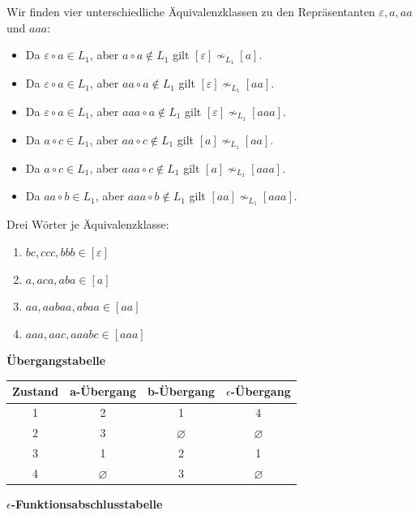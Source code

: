 \begin{teile}
	Wir finden vier unterschiedliche Äquivalenzklassen zu den Repräsentanten $\varepsilon, a, aa$ und $aaa$:
	\begin{itemize}
		\item Da $\varepsilon \circ a \in L_1$, aber $a \circ a \notin L_1$ gilt $[\varepsilon]\nsim_{L_1}[a]$.
		\item Da $\varepsilon \circ a \in L_1$, aber $aa \circ a \notin L_1$ gilt $[\varepsilon]\nsim_{L_1}[aa]$.
		\item Da $\varepsilon \circ a \in L_1$, aber $aaa \circ a \notin L_1$ gilt $[\varepsilon]\nsim_{L_1}[aaa]$.
		\item Da $a \circ c \in L_1$, aber $aa \circ c \notin L_1$ gilt $[a]\nsim_{L_1}[aa]$.
		\item Da $a \circ c \in L_1$, aber $aaa \circ c \notin L_1$ gilt $[a]\nsim_{L_1}[aaa]$.
		\item Da $aa \circ b \in L_1$, aber $aaa \circ b \notin L_1$ gilt $[aa]\nsim_{L_1}[aaa]$.
	\end{itemize}
	
	Drei Wörter je Äquivalenzklasse:
	\begin{enumerate}
		\item $bc, ccc, bbb \in [\varepsilon]$
		\item $a, aca, aba \in [a]$
		\item $aa, aabaa, abaa \in [aa]$
		\item $aaa, aac, aaabc \in [aaa]$
	\end{enumerate}
	\vspace{0.3cm}
	
	\item 
	\textbf{Übergangstabelle}
	
	\begin{tabular}{|c|c|c|c|}
		\hline
		\textbf{Zustand}  & \textbf{a-Übergang} & \textbf{b-Übergang} & \textbf{$\epsilon$-Übergang} \\
		\hline
		1                 & 2                   & 1                   & 4 \\
		\hline
		2                 & 3                   & $\varnothing$       & $\varnothing$ \\
		\hline
		3                 & 1                   & 2                   & 1 \\
		\hline
		4                 & $\varnothing$       & 3                   & $\varnothing$ \\
		\hline
	\end{tabular}
	
	
	\textbf{$\epsilon$-Funktionsabschlusstabelle}
		

\end{teile}
